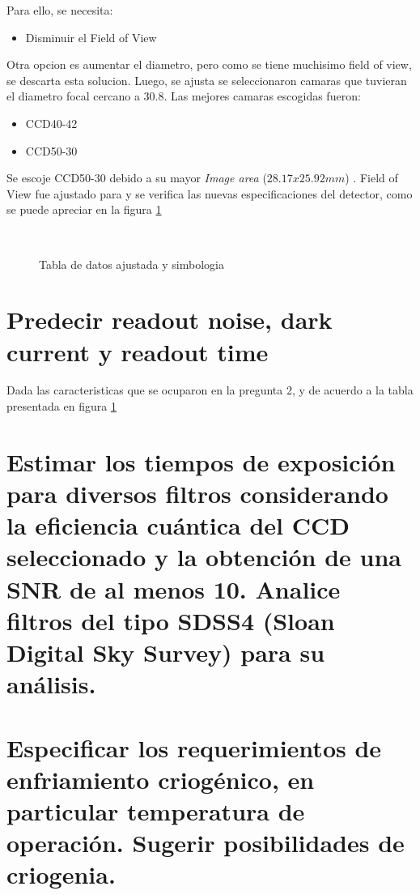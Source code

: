 \documentclass[a4paper,10pt]{article}
\begin{document}
Para ello, se necesita:
\begin{itemize}
\item Disminuir el Field of View
\end{itemize}

Otra opcion es aumentar el diametro, pero como se tiene muchisimo field of
view, se descarta esta solucion. Luego, se ajusta se seleccionaron camaras que
tuvieran el diametro focal cercano a 30.8. Las mejores camaras escogidas
fueron:
\begin{itemize}
\item CCD40-42
\item CCD50-30
\end{itemize}

Se escoje CCD50-30 debido a su mayor \textit{Image area}  ($28.17 x 25.92 mm$)
. Field of View fue ajustado para y se verifica las nuevas especificaciones del
detector, como se puede apreciar en la figura \ref{fig:p2}
\begin{figure}[ht!]
  \centering
  ~ 
  ~ 
  \caption{Tabla de datos ajustada y simbologia}
  \label{fig:p2}
\end{figure}

\section{Predecir readout noise, dark current y readout time}
Dada las caracteristicas que se ocuparon en la pregunta 2, y de acuerdo a la tabla presentada en figura \ref{fig:p2}
\section{Estimar los tiempos de exposición para diversos filtros considerando la
eficiencia cuántica del CCD seleccionado y la obtención de una SNR de al menos
10. Analice filtros del tipo SDSS4 (Sloan Digital Sky Survey) para su análisis.}

\section{Especificar los requerimientos de enfriamiento criogénico, en particular
temperatura de operación. Sugerir posibilidades de criogenia.}
\end{document}
